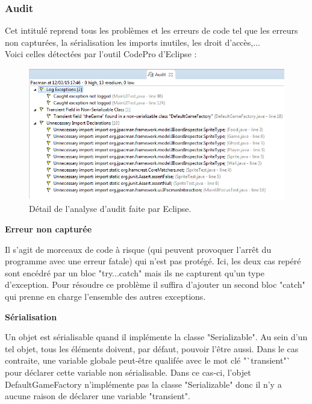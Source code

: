 \documentclass[12pt,a4paper,final]{article}
\newcommand{\smalltitle}[1]{\bigskip\large\textbf{#1}\par\normalsize\medskip}
\begin{document}
\subsubsection{Audit}
Cet intitulé reprend tous les problèmes et les erreurs de code tel que les erreurs non capturées, la sérialisation les imports inutiles, les droit d'accès,...\\
Voici celles détectées par l'outil CodePro d'Eclipse : 
\begin{figure}[!h]
	\centering
	\includegraphics[width=\textwidth]{Audit.png}
	\caption{\label{Audit}Détail de l'analyse d'audit faite par Eclipse.}
\end{figure}

\smalltitle{Erreur non capturée}
Il s'agit de morceaux de code à risque (qui peuvent provoquer l'arrêt du programme avec une erreur fatale) qui n'est pas protégé.
Ici, les deux cas repéré sont encédré par un bloc "try...catch" mais ils ne capturent qu'un type d'exception. Pour résoudre ce problème il suffira d'ajouter un second bloc "catch" qui prenne en charge l'ensemble des autres exceptions.

\smalltitle{Sérialisation}
Un objet est sérialisable quand il implémente la classe "Serializable". Au sein d'un tel objet, tous les éléments doivent, par défaut, pouvoir l'être aussi. Dans le cas contraite, une variable globale peut-être qualifée avec le mot clé "`transient"` pour déclarer cette variable non sérialisable.
Dans ce cas-ci, l'objet DefaultGameFactory n'implémente pas la classe "Serializable" donc il n'y a aucune raison de déclarer une variable "transient".
\end{document}
